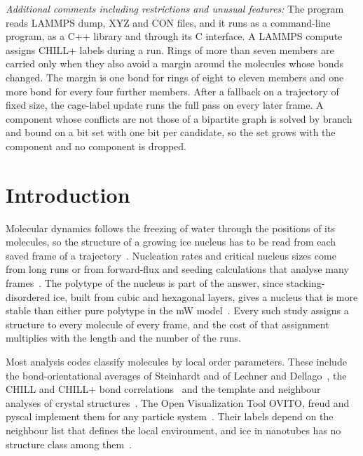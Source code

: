 \documentclass[preprint,12pt]{elsarticle}
\begin{document}
\begin{small}
{\em Additional comments including restrictions and unusual features:}
The program reads LAMMPS dump, XYZ and CON files, and it runs as a command-line program, as a C++ library and through its C interface.
A LAMMPS compute assigns CHILL+ labels during a run.
Rings of more than seven members are carried only when they also avoid a margin around the molecules whose bonds changed.
The margin is one bond for rings of eight to eleven members and one more bond for every four further members.
After a fallback on a trajectory of fixed size, the cage-label update runs the full pass on every later frame.
A component whose conflicts are not those of a bipartite graph is solved by branch and bound on a bit set with one bit per candidate, so the set grows with the component and no component is dropped.


\end{small}

\section{Introduction}
\label{sec:intro}

Molecular dynamics follows the freezing of water through the positions of its molecules, so the structure of a growing ice nucleus has to be read from each saved frame of a trajectory~\cite{matsumoto2002molecular,moore2011structural}.
Nucleation rates and critical nucleus sizes come from long runs or from forward-flux and seeding calculations that analyse many frames~\cite{li2011homogeneous,haji2015nucleation,espinosa2016seeding}.
The polytype of the nucleus is part of the answer, since stacking-disordered ice, built from cubic and hexagonal layers, gives a nucleus that is more stable than either pure polytype in the mW model~\cite{lupi2017stacking}.
Every such study assigns a structure to every molecule of every frame, and the cost of that assignment multiplies with the length and the number of the runs.

Most analysis codes classify molecules by local order parameters.
These include the bond-orientational averages of Steinhardt and of Lechner and Dellago~\cite{steinhardt1983bond,lechner2008averaged,lechner2008accurate}, the CHILL and CHILL+ bond correlations~\cite{moore2010chill,nguyen2015identification} and the template and neighbour analyses of crystal structures~\cite{larsen2016robust,stukowski2012structure,maras2016global}.
The Open Visualization Tool OVITO, freud and pyscal implement them for any particle system~\cite{stukowski2010visualization,ramasubramani2020freud,menon2019pyscal}.
Their labels depend on the neighbour list that defines the local environment, and ice in nanotubes has no structure class among them~\cite{koga2001nanotube,goswami2020dseams}.
\end{document}
